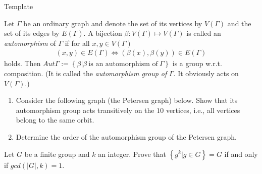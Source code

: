 \documentclass{article}
\begin{document}
\maketitle
Template
\pagebreak

\begin{homeworkProblem}
    Let $\Gamma$ be an ordinary graph and denote the set of its 
    vertices by $V(\Gamma)$ and the set of its edges by $E(\Gamma)$.
    A bijection $\beta: V(\Gamma) \mapsto V(\Gamma)$ is
    called an \textit{automorphism} of $\Gamma$ if 
    for all $x,y \in V(\Gamma)$
    \begin{align}
        (x,y) \in E(\Gamma) \iff (\beta(x), \beta(y)) \in E(\Gamma)
    \end{align}
    holds. Then $Aut \Gamma := \left\{ \beta | \beta \ \text{is an automorphism of} \ \Gamma \right\}$
    is a group w.r.t. composition. 
    (It is called the \textit{automorphism group of} $\Gamma$. 
    It obviously acts on $V(\Gamma)$.)
    \begin{enumerate}
        \item Consider the following graph (the Petersen graph) below.
            Show that its automorphism group acts transitively
            on the $10$ vertices, i.e., all vertices belong to the same orbit.\\
        \item Determine the order of the automorphism group of the Petersen graph.
    \end{enumerate}
    

    


    
\end{homeworkProblem}

\pagebreak

\begin{homeworkProblem}


\end{homeworkProblem}

\pagebreak

\begin{homeworkProblem}
     Let $G$ be a finite group and 
     $k$ an integer. 
     Prove that $\left\{ g^k | g \in G \right\} = G$
     if and only if $gcd \left( \lvert G \rvert, k \right) = 1$.\\
 
     \solution
 
    


    
\end{homeworkProblem}

\pagebreak
\end{document}
